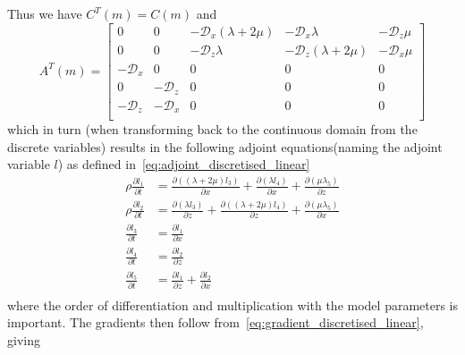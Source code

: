 \documentclass[fleqn,11pt]{SelfArx} %
\newcommand{\pder}[2][]{\frac{\partial#1}{\partial#2}}
\theoremstyle{definition}
\begin{document}
Thus we have $C^T\left(m\right) = C\left(m\right)$ and 
\begin{equation}
A^T\left(m\right) = 
\begin{bmatrix}
0 & 0 & -\mathcal{D}_x\left(\lambda + 2\mu\right) & -\mathcal{D}_x\lambda & -\mathcal{D}_z\mu \\
0 & 0 & -\mathcal{D}_z \lambda & -\mathcal{D}_z\left(\lambda + 2\mu\right) & -\mathcal{D}_x\mu \\
-\mathcal{D}_x & 0 & 0 & 0 & 0 \\
0 & -\mathcal{D}_z & 0 & 0 & 0 \\
-\mathcal{D}_z & -\mathcal{D}_x & 0 & 0 & 0 \\
\end{bmatrix}
\end{equation}
which in turn (when transforming back to the continuous domain from the discrete variables) results in the following adjoint equations(naming the adjoint variable $l$) as defined in~\cref{eq:adjoint_discretised_linear}
\begin{equation}\label{eq:elastic_adjoint}
\begin{aligned}
\rho \pder[l_1]{t} &= \pder[\left(\left(\lambda + 2\mu\right)l_3\right)]{x} + \pder[\left(\lambda l_4\right)]{x} + \pder[\left(\mu \lambda_5\right)]{z} \\
\rho \pder[l_2]{t} &= \pder[\left(\lambda l_3\right)]{z} + \pder[\left(\left(\lambda + 2\mu\right)l_4\right)]{z} + \pder[\left(\mu \lambda_5\right)]{x} \\
\pder[l_3]{t} &= \pder[l_1]{x}\\
\pder[l_4]{t} &= \pder[l_2]{z}\\
\pder[l_5]{t} &= \pder[l_1]{z} + \pder[l_2]{x}\\
\end{aligned}
\end{equation}
where the order of differentiation and multiplication with the model parameters is important. 
The gradients then follow from~\cref{eq:gradient_discretised_linear}, giving 
\end{document}
